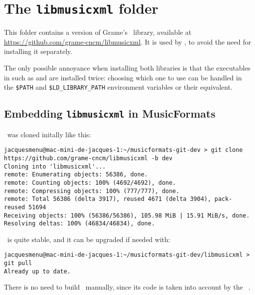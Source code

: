 \section{The {\tt libmusicxml} folder}

This folder contains a version of Grame's \libmusicxml\ library, available at \url{https://github.com/grame-cncm/libmusicxml}. It is used by \mf, to avoid the need for installing it separately.

The only possible annoyance when installing both libraries is that the executables in  such as  and  are installed twice: choosing which one to use can be handled in the {\tt \$\textbraceleft PATH\textbraceright} and {\tt \$\textbraceleft LD_LIBRARY_PATH\textbraceright} environment variables or their equivalent.


\subsection{Embedding {\tt libmusicxml} in MusicFormats}

\libmusicxml\ was cloned initally like this:
 \begin{lstlisting}[language=Terminal]
jacquesmenu@mac-mini-de-jacques-1:~/musicformats-git-dev > git clone https://github.com/grame-cncm/libmusicxml -b dev
Cloning into 'libmusicxml'...
remote: Enumerating objects: 56386, done.
remote: Counting objects: 100% (4692/4692), done.
remote: Compressing objects: 100% (777/777), done.
remote: Total 56386 (delta 3917), reused 4671 (delta 3904), pack-reused 51694
Receiving objects: 100% (56386/56386), 105.98 MiB | 15.91 MiB/s, done.
Resolving deltas: 100% (46834/46834), done.
\end{lstlisting}

 \libmusicxml\ is quite stable, and it can be upgraded if needed with:
 \begin{lstlisting}[language=Terminal]
jacquesmenu@mac-mini-de-jacques-1:~/musicformats-git-dev/libmusicxml > git pull
Already up to date.
\end{lstlisting}

There is no need to build \libmusicxml\ manually, since its code is taken into account by the \mf\ \Makefile.


